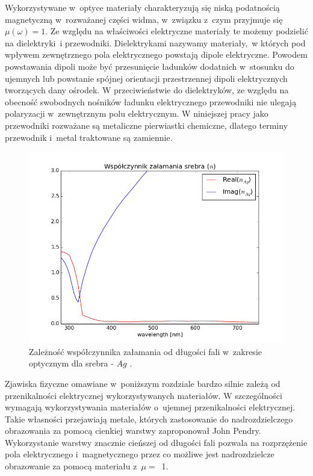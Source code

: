 Wykorzystywane w~optyce materiały charakteryzują się niską podatnością magnetyczną w~rozważanej części widma, w~związku z~czym przyjmuje się ${\mu(\omega)=1}$. Ze względu na właściwości elektryczne  materiały te możemy  podzielić na dielektryki~i przewodniki. Dielektrykami nazywamy materiały,~w których pod wpływem zewnętrznego pola elektrycznego powstają dipole elektryczne. Powodem powstawania dipoli może być przesunięcie ładunków dodatnich w~stosunku do ujemnych lub powstanie spójnej orientacji przestrzennej dipoli elektrycznych tworzących dany ośrodek. W przeciwieństwie do dielektryków, ze względu na obecność swobodnych nośników ładunku elektrycznego przewodniki nie ulegają polaryzacji w~zewnętrznym polu elektrycznym. W niniejszej pracy jako przewodniki rozważane są metaliczne pierwiastki chemiczne, dlatego terminy przewodnik i~metal traktowane są zamiennie.

\begin{figure}[tb]
	\includegraphics[width=\textwidth]{images/agn.png}
	\caption{Zależność współczynnika załamania od długości fali w~zakresie optycznym dla srebra - $Ag$ \cite{PhysRevB.6.4370}.  }
	\label{fig:agn}
\end{figure}
Zjawiska fizyczne omawiane w~poniższym rozdziale bardzo silnie zależą od przenikalności elektrycznej wykorzystywanych materiałów. W szczególności wymagają wykorzystywania materiałów o~ujemnej przenikalności elektrycznej. Takie własności przejawiają metale, których zastosowanie do nadrozdzielczego obrazowania za pomocą cienkiej warstwy zaproponował John Pendry. Wykorzystanie warstwy znacznie cieńszej od długości fali pozwala na rozprzężenie pola elektrycznego i~magnetycznego przez co możliwe jest nadrozdzielcze obrazowanie za pomocą materiału z~$\mu=$~1\cite{PhysRevLett.85.3966}.

